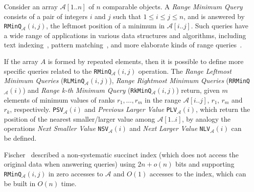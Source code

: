 Consider an array ${\mathcal{A}}[1..n]$ of $n$ comparable objects. A \emph{Range
  Minimum
  Query}~\cite{1993-SICOMP-RecursiveStarTreeParallelDataStructure-BerkmanVishkin}
consists of a pair of integers $i$ and $j$ such that
$1\le i\le j\le n$, and is answered by
\texttt{RMinQ}$_{\mathcal{A}}(i,j)$, the leftmost position of a
minimum in $\mathcal{A}[i..j]$. Such queries have a wide range of
applications in various data structures and algorithms, including text
indexing~\cite{2009-TCS-FasterEntropyBoundedCompressedSuffixTrees-FischerMakinenNavarro},
pattern
matching~\cite{2008-STACS-ImprovedAlgorithmsForTheRangeNextValueProblemAndApplications-CrochemoreIliopoulosKubicaRahmanWalen},
and more elaborate kinds of range
queries~\cite{2004-ISAAC-OnTheRangeMaximumSumSegmentQueryProblem-ChenChao}.


If the array $A$ is formed by repeated elements, then it is possible
to define more specific queries related to the
\texttt{RMinQ}$_{\mathcal{A}}(i,j)$ operation. The \emph{Range
  Leftmost Minimum Queries} (\texttt{RLMinQ}$_{\mathcal{A}}(i,j)$),
\emph{Range Rightmost Minimum Queries}
(\texttt{RRMinQ}$_{\mathcal{A}}(i)$) and \emph{Range k-th Minimum
  Query} (\texttt{RkMinQ}$_{\mathcal{A}}(i,j)$) return, given $m$
elements of minimum values of ranks $r_1, \dots, r_m$ in the range
${\mathcal{A}}[i..j]$, $r_1$, $r_m$ and $r_k$, respectively.
\texttt{PSV}$_{\mathcal{A}}(i)$ and \emph{Previous Larger Value}
\texttt{PLV}$_{\mathcal{A}}(i)$, which return the position of the nearest
smaller/larger value among ${\mathcal{A}}[1..i]$, by analogy the operations
\emph{Next Smaller Value} \texttt{NSV}$_{\mathcal{A}}(i)$ and \emph{Next Larger Value}
\texttt{NLV}$_{\mathcal{A}}(i)$ can be defined.

Fischer~\cite{2010-LATIN-OptimalSuccinctnessForRangeMinimumQueries-Fischer}
described a non-systematic succinct index (which does not access the
original data when answering queries) using $2n+o(n)$ bits and
supporting \texttt{RMinQ}$_{\mathcal{A}}(i,j)$ in zero accesses to
$\mathcal{A}$ and $O(1)$ accesses to the index, which can be built in
$O(n)$ time.

